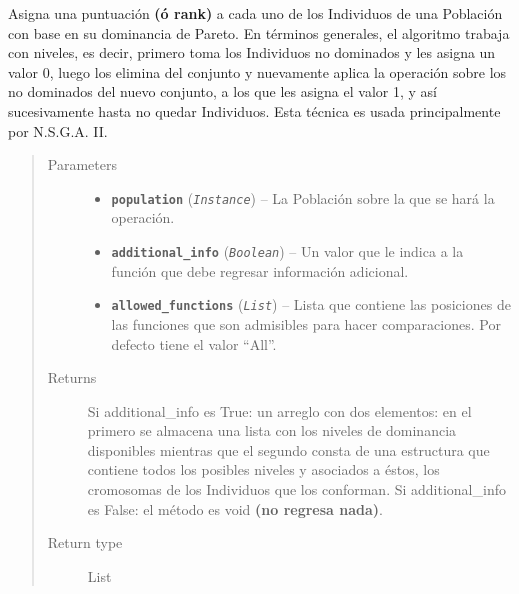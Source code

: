 \documentclass[class=report, crop=false]{standalone}
\begin{document}
\begin{fulllineitems}
\begin{fulllineitems}
\end{fulllineitems}

\begin{fulllineitems}

Asigna una puntuación \textbf{(ó rank)} a cada uno de los Individuos 
de una Población con base en su dominancia de Pareto.\break
En términos generales, el algoritmo trabaja con niveles, es decir, 
primero toma los Individuos no dominados y les asigna un valor 0, 
luego los elimina del conjunto y nuevamente aplica la operación sobre 
los no dominados del nuevo conjunto, a los que les asigna el valor 1, 
y así sucesivamente hasta no quedar Individuos.\break
Esta técnica es usada principalmente por N.S.G.A. II.

\begin{quote}\begin{description}
\item[{Parameters}] \leavevmode\begin{itemize}
\item \textbf{\texttt{population}} (\emph{\texttt{Instance}}) -- La Población sobre la que se hará la operación.
\item \textbf{\texttt{additional\_info}} (\emph{\texttt{Boolean}}) -- Un valor que le indica a la función que debe regresar información 
adicional.
\item \textbf{\texttt{allowed\_functions}} (\emph{\texttt{List}}) -- Lista que contiene las posiciones de las funciones que son admisibles 
para hacer comparaciones. Por defecto tiene el valor ``All''.
\end{itemize}

\item[{Returns}] \leavevmode
Si additional\_info es True: un arreglo con dos elementos: en el 
primero se almacena una lista con los niveles de dominancia disponibles 
mientras que el segundo consta de una estructura que contiene todos 
los posibles niveles y asociados a éstos, los cromosomas de los 
Individuos que los conforman.\break
Si additional\_info es False: el método es void \textbf{(no regresa nada)}.
\item[{Return type}] \leavevmode
List
\end{description}\end{quote}

\end{fulllineitems}


\end{fulllineitems}
\end{document}
